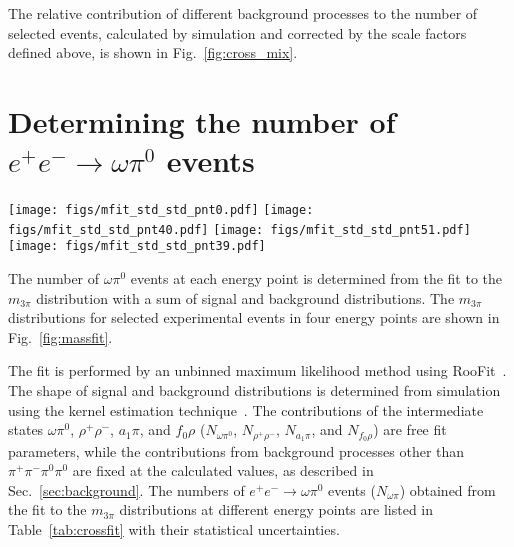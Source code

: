 \documentclass[twocolumn,aps,prd,floatfix,nofootinbib,superscriptaddress]{revtex4-2}
\begin{document}
The relative contribution of different background processes to the number of selected events, calculated by simulation and corrected by the scale factors defined above, is shown in Fig.~\ref{fig:cross_mix}.

\section{Determining the number of \( e^+e^- \to \omega\pi^0 \) events}
\label{sec:omegafitting}

\begin{figure*}
\centering
\texttt{[image: figs/mfit\_std\_std\_pnt0.pdf]}
\texttt{[image: figs/mfit\_std\_std\_pnt40.pdf]}
\texttt{[image: figs/mfit\_std\_std\_pnt51.pdf]}
\texttt{[image: figs/mfit\_std\_std\_pnt39.pdf]}
\caption{
	The distribution of the $\pi^+\pi^-\pi^0$ invariant mass closest to the $\omega$ mass for selected data events with $E = 1050$, 1280, 1900, 2000 MeV (points with error bars).
	The solid curve is the result of the fit to the data distribution with a sum of signal and background distributions described in the text.
	The green dashed region is the fitted contribution from background $\pi^+\pi^-\pi^0\pi^0$ events with intermediate states other than $\omega\pi^0$.
	The red dashed region is the expected background from other processes.
}
\label{fig:massfit}
\end{figure*}

The number of $\omega\pi^0$ events at each energy point is determined from the fit to the $m_{3\pi}$ distribution with a sum of signal and background distributions.
The $m_{3\pi}$ distributions for selected experimental events in four energy points are shown in Fig.~\ref{fig:massfit}.

The fit is performed by an unbinned maximum likelihood method using RooFit~\cite{roofit}.
The shape of signal and background distributions is determined from simulation using the kernel estimation technique~\cite{kernel}.
The contributions of the intermediate states $\omega\pi^0$, $\rho^+\rho^-$, $a_1\pi$, and $f_0\rho$ ($N_{\omega\pi^0}$, $N_{ \rho^+\rho^-}$, $N_{a_1\pi}$, and $N_{f_0\rho}$) are free fit parameters, while the contributions from background processes other than $\pi^+\pi^-\pi^0\pi^0$ are fixed at the calculated values, as described in Sec.~\ref{sec:background}.
The numbers of \( e^+e^- \to \omega\pi^0 \) events ($N_{\omega\pi}$) obtained from the fit to the $m_{3\pi}$ distributions at different energy points are listed in Table~\ref{tab:crossfit} with their statistical uncertainties.
\end{document}
